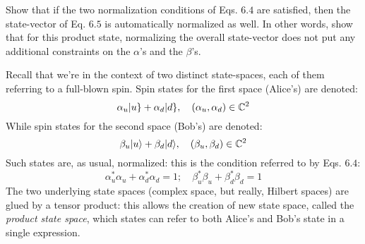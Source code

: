 \documentclass[solutions.tex]{subfiles}
\begin{document}
\maketitle
\begin{exercise} Show that if the two normalization conditions
of Eqs. $6.4$ are satisfied, then the state-vector of Eq. $6.5$
is automatically normalized as well. In other words, show that
for this product state, normalizing the overall state-vector does
not put any additional constraints on the $\alpha$'s and the $\beta$'s.
\end{exercise}
Recall that we're in the context of two distinct state-spaces, each
of them referring to a full-blown spin. Spin states for the first space
(Alice's) are denoted:
\[
	\alpha_u|u\} + \alpha_d|d\},\quad (\alpha_u, \alpha_d)\in\mathbb{C}^2
\]
While spin states for the second space (Bob's) are denoted:
\[
	\beta_u|u\rangle + \beta_d|d\rangle,\quad (\beta_u, \beta_d)\in\mathbb{C}^2
\]
Such states are, as usual, normalized: this is the condition referred
to by Eqs. $6.4$:
\[
	\alpha_u^*\alpha_u + \alpha_d^*\alpha_d = 1;\quad
	\beta_u^*\beta_u + \beta_d^*\beta_d = 1
\]
The two underlying state spaces (complex space, but really, Hilbert
spaces) are glued by a tensor product: this allows the creation of
new state space, called the \textit{product state space}, which
states can refer to both Alice's and Bob's state in a single expression.
\end{document}
